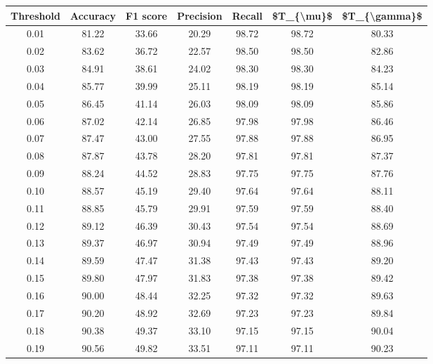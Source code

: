 \begin{tabular}{|c|c|c|c|c|c|c|}
\hline
 Threshold &  Accuracy &  F1 score &  Precision &  Recall &  \$T\_\{\textbackslash mu\}\$ &  \$T\_\{\textbackslash gamma\}\$ \\
\hline
      0.01 &     81.22 &     33.66 &      20.29 &   98.72 &      98.72 &         80.33 \\
      0.02 &     83.62 &     36.72 &      22.57 &   98.50 &      98.50 &         82.86 \\
      0.03 &     84.91 &     38.61 &      24.02 &   98.30 &      98.30 &         84.23 \\
      0.04 &     85.77 &     39.99 &      25.11 &   98.19 &      98.19 &         85.14 \\
      0.05 &     86.45 &     41.14 &      26.03 &   98.09 &      98.09 &         85.86 \\
      0.06 &     87.02 &     42.14 &      26.85 &   97.98 &      97.98 &         86.46 \\
      0.07 &     87.47 &     43.00 &      27.55 &   97.88 &      97.88 &         86.95 \\
      0.08 &     87.87 &     43.78 &      28.20 &   97.81 &      97.81 &         87.37 \\
      0.09 &     88.24 &     44.52 &      28.83 &   97.75 &      97.75 &         87.76 \\
      0.10 &     88.57 &     45.19 &      29.40 &   97.64 &      97.64 &         88.11 \\
      0.11 &     88.85 &     45.79 &      29.91 &   97.59 &      97.59 &         88.40 \\
      0.12 &     89.12 &     46.39 &      30.43 &   97.54 &      97.54 &         88.69 \\
      0.13 &     89.37 &     46.97 &      30.94 &   97.49 &      97.49 &         88.96 \\
      0.14 &     89.59 &     47.47 &      31.38 &   97.43 &      97.43 &         89.20 \\
      0.15 &     89.80 &     47.97 &      31.83 &   97.38 &      97.38 &         89.42 \\
      0.16 &     90.00 &     48.44 &      32.25 &   97.32 &      97.32 &         89.63 \\
      0.17 &     90.20 &     48.92 &      32.69 &   97.23 &      97.23 &         89.84 \\
      0.18 &     90.38 &     49.37 &      33.10 &   97.15 &      97.15 &         90.04 \\
      0.19 &     90.56 &     49.82 &      33.51 &   97.11 &      97.11 &         90.23 \\

\end{tabular}
